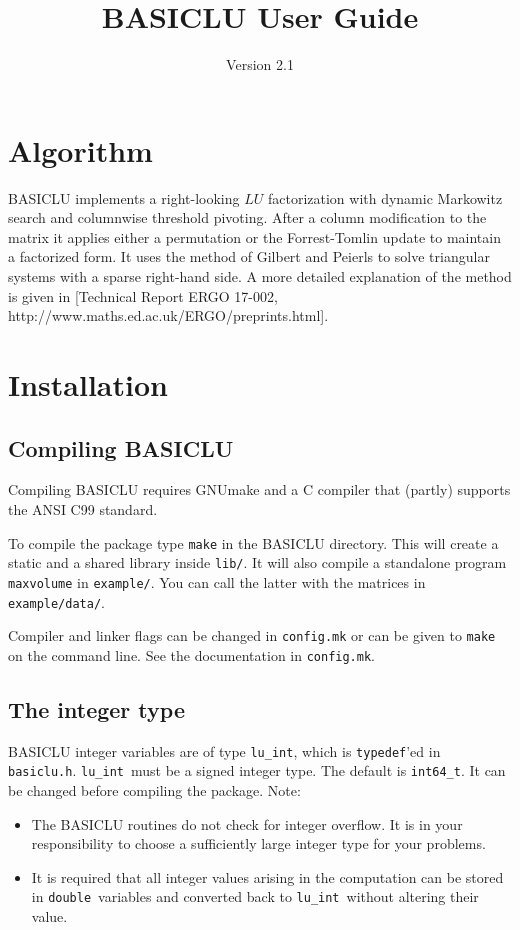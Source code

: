 \documentclass{article}
\title{BASICLU User Guide}
\author{Version 2.1}
\newcommand{\ct}{\texttt}
\newcommand{\luint}{\ct{lu\_int}}
\newcommand{\double}{\ct{double}}
\begin{document}
\maketitle

\tableofcontents
\newpage

\section{Algorithm}
BASICLU implements a right-looking $LU$ factorization with dynamic Markowitz
search and columnwise threshold pivoting. After a column modification to the
matrix it applies either a permutation or the Forrest-Tomlin update to maintain
a factorized form. It uses the method of Gilbert and Peierls to solve triangular
systems with a sparse right-hand side. A more detailed explanation of the method
is given in [Technical Report ERGO 17-002,
http://www.maths.ed.ac.uk/ERGO/preprints.html].

\section{Installation}
\label{sec:install}
\subsection{Compiling BASICLU}
Compiling BASICLU requires GNUmake and a C compiler that (partly) supports the
ANSI C99 standard.

To compile the package type \ct{make} in the BASICLU directory. This will create
a static and a shared library inside \ct{lib/}. It will also compile a
standalone program \ct{maxvolume} in \ct{example/}. You can call the latter with
the matrices in \ct{example/data/}.

Compiler and linker flags can be changed in \ct{config.mk} or can be given to
\ct{make} on the command line. See the documentation in \ct{config.mk}.

\subsection{The integer type}
BASICLU integer variables are of type \luint, which is \ct{typedef}'ed in
\ct{basiclu.h}. \luint\ must be a signed integer type. The default is
\ct{int64\_t}. It can be changed before compiling the package. Note:
\begin{itemize}
\item The BASICLU routines do not check for integer overflow. It is in your
  responsibility to choose a sufficiently large integer type for your problems.
\item It is required that all integer values arising in the computation can be
  stored in \double\ variables and converted back to \luint\ without altering
  their value.
\end{itemize}
\end{document}
